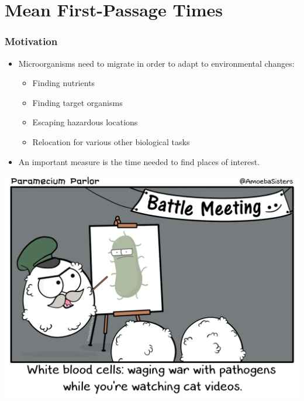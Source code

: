 \documentclass[11pt]{beamer}
\begin{document}
\section{Mean First-Passage Times}

\begin{frame}
 \frametitle{Motivation}
 
 \begin{minipage}[h]{0.5\linewidth}
  \begin{itemize}
   \item Microorganisms need to migrate in order to adapt to environmental changes:
   \begin{itemize}
    \item Finding nutrients
    \item Finding target organisms
    \item Escaping hazardous locations
    \item Relocation for various other biological tasks
   \end{itemize}
   \item An important measure is the time needed to find places of interest.

  \end{itemize}
 \end{minipage}
 \begin{minipage}[h]{0.45\linewidth}
   \centering
   \includegraphics[width=1.0\linewidth]{gfx/white-blood-cell-battle-meeting_orig.png}
 \end{minipage}

\end{frame}
\end{document}
